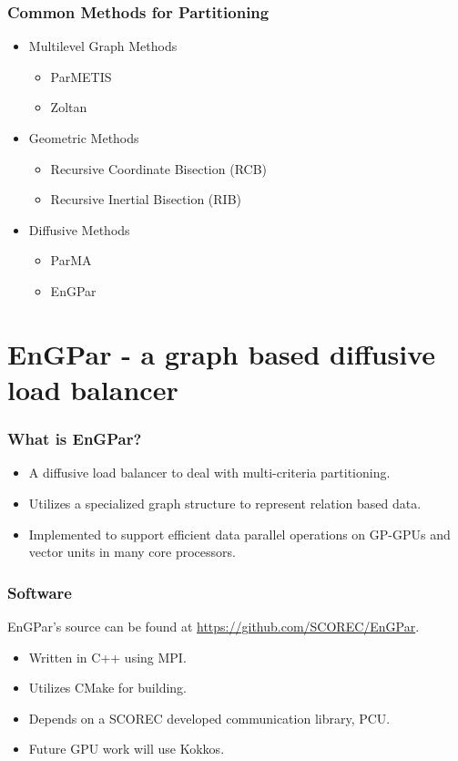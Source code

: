 \documentclass{beamer}
\begin{document}
\begin{frame}
  \frametitle{Common Methods for Partitioning}
  \begin{itemize}
  \item Multilevel Graph Methods %
    \begin{itemize}
    \item ParMETIS
    \item Zoltan
    \end{itemize}
  \item Geometric Methods %
    \begin{itemize}
    \item Recursive Coordinate Bisection (RCB)
    \item Recursive Inertial Bisection (RIB)
    \end{itemize}
  \item Diffusive Methods %
    \begin{itemize}
    \item ParMA
    \item EnGPar
    \end{itemize}
  \end{itemize}
\end{frame}


\section{EnGPar - a graph based diffusive load balancer}

\begin{frame}
  \frametitle{What is EnGPar?}
  \begin{itemize}
  \item A diffusive load balancer to deal with multi-criteria partitioning.
  \item Utilizes a specialized graph structure to represent relation based data.
  \item Implemented to support efficient data parallel operations on GP-GPUs and vector units in many core processors.
  \end{itemize}
\end{frame}

\begin{frame}
  \frametitle{Software}
  EnGPar's source can be found at \url{https://github.com/SCOREC/EnGPar}.
  \begin{itemize}
  \item Written in C++ using MPI.
  \item Utilizes CMake for building.
  \item Depends on a SCOREC developed communication library, PCU.
  \item Future GPU work will use Kokkos.
  \end{itemize}
\end{frame}
\end{document}
